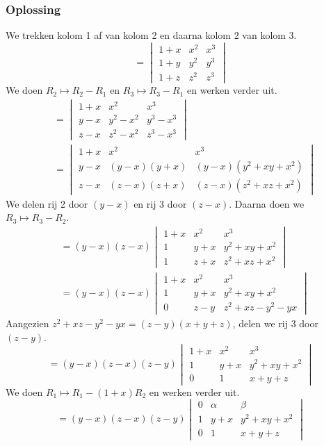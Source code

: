 \documentclass[lineaire_algebra_oplossingen.tex]{subfiles}
\begin{document}
\subsubsection*{Oplossing} %
We trekken kolom 1 af van kolom 2 en daarna kolom 2 van kolom 3.
\[
=
\begin{vmatrix}
1+x & x^2 & x^3\\
1+y & y^2 & y^3\\
1+z & z^2 & z^3
\end{vmatrix}
\]
We doen $R_2 \longmapsto R_2 - R_1$ en $R_3 \longmapsto R_3 - R_1$ en werken verder uit.
\begin{align*}
&=
\begin{vmatrix}
1+x & x^2     & x^3\\
y-x & y^2-x^2 & y^3-x^3\\
z-x & z^2-x^2 & z^3-x^3
\end{vmatrix} \\
&=
\begin{vmatrix}
1+x & x^2        & x^3\\
y-x & (y-x)(y+x) & (y-x)(y^2+xy+x^2)\\
z-x & (z-x)(z+x) & (z-x)(z^2+xz+x^2)
\end{vmatrix}
\end{align*}
We delen rij 2 door $(y-x)$ en rij 3 door $(z-x)$. Daarna doen we $R_3 \longmapsto R_3 - R_2$.
\begin{align*}
&=
(y-x)(z-x)
\begin{vmatrix}
1+x & x^2 & x^3\\
1   & y+x & y^2+xy+x^2\\
1   & z+x & z^2+xz+x^2
\end{vmatrix} \\
&=
(y-x)(z-x)
\begin{vmatrix}
1+x & x^2 & x^3\\
1   & y+x & y^2+xy+x^2\\
0   & z-y & z^2+xz-y^2-yx
\end{vmatrix}
\end{align*}
Aangezien $z^2+xz-y^2-yx = (z-y)(x+y+z)$, delen we rij 3 door $(z-y)$.
\[
=
(y-x)(z-x)(z-y)
\begin{vmatrix}
1+x & x^2 & x^3\\
1   & y+x & y^2+xy+x^2\\
0   & 1 & x+y+z
\end{vmatrix}
\]
We doen $R_1 \longmapsto R_1 - (1+x)R_2$ en werken verder uit.
\[
=
(y-x)(z-x)(z-y)
\begin{vmatrix}
0 & \alpha & \beta \\
1 & y+x & y^2+xy+x^2\\
0 & 1 & x+y+z
\end{vmatrix}
\]
\end{document}
